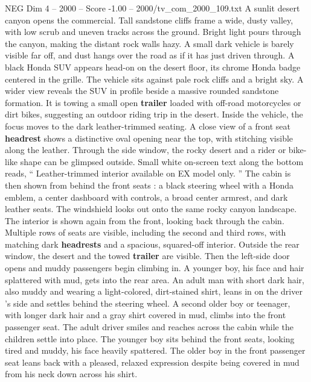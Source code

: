 \begin{textsample}{NEG Dim 4 – 2000 – Score -1.00 – 2000/tv\_com\_2000\_109.txt}  \label{ex:f4_neg_047}
A sunlit desert canyon opens the commercial.
Tall sandstone cliffs frame a wide, dusty valley, with low scrub and uneven tracks across the ground.
Bright light pours through the canyon, making the distant rock walls hazy.
A small dark vehicle is barely visible far off, and dust hangs over the road as if it has just driven through.
A black Honda SUV appears head-on on the desert floor, its chrome Honda badge centered in the grille.
The vehicle sits against pale rock cliffs and a bright sky.
A wider view reveals the SUV in profile beside a massive rounded sandstone formation.
It is towing a small open \textbf{trailer} loaded with off-road motorcycles or dirt bikes, suggesting an outdoor riding trip in the desert.
Inside the vehicle, the focus moves to the dark leather-trimmed seating.
A close view of a front seat \textbf{headrest} shows a distinctive oval opening near the top, with stitching visible along the leather.
Through the side window, the rocky desert and a rider or bike-like shape can be glimpsed outside.
Small white on-screen text along the bottom reads, “ Leather-trimmed interior available on EX model only. ” The cabin is then shown from behind the front seats : a black steering wheel with a Honda emblem, a center dashboard with controls, a broad center armrest, and dark leather seats.
The windshield looks out onto the same rocky canyon landscape.
The interior is shown again from the front, looking back through the cabin.
Multiple rows of seats are visible, including the second and third rows, with matching dark \textbf{headrests} and a spacious, squared-off interior.
Outside the rear window, the desert and the towed \textbf{trailer} are visible.
Then the left-side door opens and muddy passengers begin climbing in.
A younger boy, his face and hair splattered with mud, gets into the rear area.
An adult man with short dark hair, also muddy and wearing a light-colored, dirt-stained shirt, leans in on the driver ’s side and settles behind the steering wheel.
A second older boy or teenager, with longer dark hair and a gray shirt covered in mud, climbs into the front passenger seat.
The adult driver smiles and reaches across the cabin while the children settle into place.
The younger boy sits behind the front seats, looking tired and muddy, his face heavily spattered.
The older boy in the front passenger seat leans back with a pleased, relaxed expression despite being covered in mud from his neck down across his shirt.

\end{textsample}
